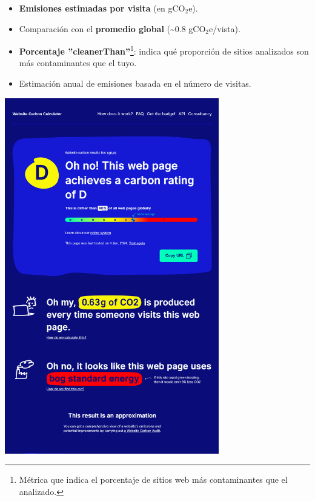 \documentclass[12pt,a4paper]{report}
\begin{document}
\begin{itemize}
  \item \textbf{Emisiones estimadas por visita} (en gCO$_2$e).
  \item Comparación con el \textbf{promedio global} (\textasciitilde0.8
        gCO$_2$e/vista).
  \item \textbf{Porcentaje ''cleanerThan''}\footnote{Métrica que indica el porcentaje de sitios web más contaminantes que el analizado.}: indica qué proporción de sitios analizados son más contaminantes que el tuyo.
  \item Estimación anual de emisiones basada en el número de visitas.
\end{itemize}

\begin{center}
  \includegraphics[width=0.7\textwidth]{imagenes/WCC_2.png}
\end{center}
\end{document}
